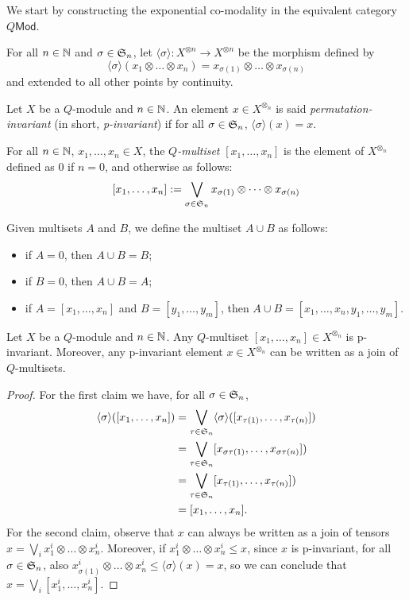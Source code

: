 We start by constructing the exponential co-modality in the equivalent category $Q\mathsf{Mod}$.


For all $n\in \mathbb{N}$ and $\sigma\in \mathfrak{S}_{n}$, let $\langle \sigma\rangle: X^{\otimes n}\to X^{\otimes n}$ be the morphism defined by 
$$
\langle \sigma \rangle (x_{1}\otimes \dots \otimes x_{n})=
x_{\sigma(1)}\otimes \dots \otimes x_{\sigma(n)}
$$
and extended to all other points by continuity.
%
\begin{definition}Let $X$ be a $Q$-module and $n\in \mathbb{N}$. 
An element $x\in X^{\otimes_{n}}$ is said \emph{permutation-invariant} (in short, \emph{p-invariant}) if for all $\sigma\in \mathfrak{S}_{n}$, 
$\langle \sigma \rangle (x)=x$.

For all $n\in \mathbb{N}$, $x_{1},\dots, x_{n}\in X$, the \emph{$Q$-multiset} $[x_{1},\dots, x_{n}]$ is the element of $X^{\otimes_{n}}$ defined as $0$ if $n=0$, and otherwise as follows:
$$
[x_{1},\dots, x_{n}]:= \bigvee_{\sigma\in \mathfrak{S}_{n}}x_{\sigma(1)}\otimes \dots \otimes x_{\sigma(n)}
$$

Given multisets $A$ and $B$, we define the multiset $A\cup B$ as follows:
\begin{itemize}
\item if $A=0$, then $A\cup B=B$;
\item if $B=0$, then $A\cup B=A$;
\item if $A=[x_{1},\dots, x_{n}]$ and $B=[y_{1},\dots, y_{m}]$, then $A\cup B=[x_{1},\dots, x_{n},y_{1},\dots, y_{m}]$.


\end{itemize}

\end{definition}

\begin{proposition}
Let $X$ be a $Q$-module and $n\in \mathbb{N}$. Any $Q$-multiset $[x_{1},\dots, x_{n}]\in X^{\otimes_{n}}$ is p-invariant. Moreover, any p-invariant element $x\in X^{\otimes_{n}}$ can be written as 
a join of $Q$-multisets.
\end{proposition}
\begin{proof}
For the first claim we have, for all $\sigma\in \mathfrak{S}_{n}$, 
\begin{align*}
\langle \sigma \rangle ([x_{1},\dots, x_{n}]) & = 
\bigvee_{\tau\in \mathfrak{S}_{n}}\langle \sigma \rangle ([x_{\tau(1)},\dots, x_{\tau(n)}])\\
 & = 
\bigvee_{\tau\in \mathfrak{S}_{n}}[x_{\sigma\tau(1)},\dots, x_{\sigma\tau(n)}])\\
 & = 
\bigvee_{\tau\in \mathfrak{S}_{n}}[x_{\tau(1)},\dots, x_{\tau(n)}])\\
&= [x_{1},\dots, x_{n}].
\end{align*}
For the second claim, observe that $x$ can always be written as a join of tensors $x=\bigvee_{i}x_{1}^{i}\otimes \dots \otimes x_{n}^{i}$. Moreover, 
if $x_{1}^{i}\otimes \dots \otimes x_{n}^{i}\leq x$, since $x$ is p-invariant, for all $\sigma \in \mathfrak{S}_{n}$, also
$x_{\sigma(1)}^{i}\otimes \dots \otimes x_{n}^{i}\leq \langle \sigma\rangle(x)=x$, so we can conclude that 
$x=\bigvee_{i}[x_{1}^{i},\dots, x_{n}^{i}]$.
\end{proof}



